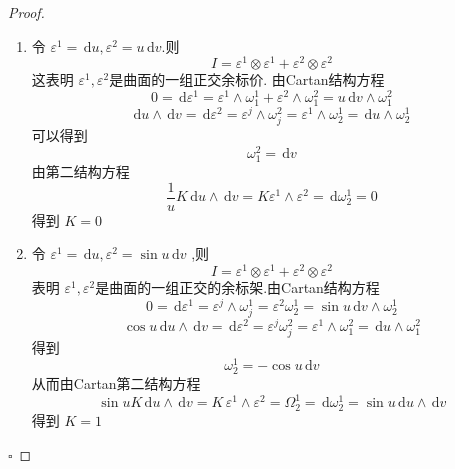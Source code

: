 \documentclass[../../main.tex]{subfiles}
\begin{document}
\begin{proof}
    \begin{enumerate}
        \item 令 \(   \varepsilon ^{1}= \,\mathrm{d} u,  \varepsilon ^{2}=  u\,\mathrm{d} v   \).则 \[
        I=   \varepsilon ^{1}\otimes  \varepsilon ^{1}+  \varepsilon ^{2}\otimes  \varepsilon ^{2}
        \] 这表明 \(   \varepsilon ^{1}, \varepsilon ^{2}  \)是曲面的一组正交余标价.  由Cartan结构方程 \[
        0= \,\mathrm{d}  \varepsilon ^{1}=\varepsilon ^{1}  \wedge \omega _{1}^{1} + \varepsilon ^{2} \wedge  \omega _{1}^{2} = u\,\mathrm{d} v\wedge \omega _{1}^{2}
        \]\[
       \mathrm{d} u\wedge \,\mathrm{d} v= \,\mathrm{d}  \varepsilon ^{2}=   \varepsilon ^{j}\wedge\omega _{j}^{2}  =\varepsilon ^{1}  \wedge \omega _{2}^{1} =\,\mathrm{d} u\wedge   \omega _{2}^{1}
        \]可以得到 \[
         \omega _{1}^{2}= \,\mathrm{d} v
        \]由第二结构方程 \[
       \frac{1 }{u }K\,\mathrm{d} u\wedge \,\mathrm{d} v=   K \varepsilon ^{1}\wedge  \varepsilon ^{2}= \,\mathrm{d}  \omega _{2}^{1}=0
        \]得到 \(  K=0   \)
        \item 令 \(   \varepsilon ^{1}= \,\mathrm{d} u, \varepsilon ^{2}= \sin u\,\mathrm{d} v  \)  ,则 \[
        I=   \varepsilon ^{1}\otimes  \varepsilon ^{1}+  \varepsilon ^{2}\otimes  \varepsilon ^{2}
        \]表明 \(   \varepsilon ^{1}, \varepsilon ^{2}  \)是曲面的一组正交的余标架.由Cartan结构方程 \[
       0= \,\mathrm{d}  \varepsilon ^{1}=  \varepsilon ^{j}\wedge  \omega _{j}^{1}=  \varepsilon ^{2} \omega _{2}^{1}= \sin u \,\mathrm{d} v \wedge  \omega _{2}^{1}
        \] \[
        \cos u\,\mathrm{d} u\wedge \,\mathrm{d} v= \,\mathrm{d}  \varepsilon ^{2}=   \varepsilon ^{j} \omega _{j}^{2}=  \varepsilon ^{1}\wedge  \omega _{1}^{2}= \,\mathrm{d} u\wedge  \omega _{1}^{2}
        \]得到 \[
         \omega _{2}^{1}=- \cos u\,\mathrm{d} v
        \]从而由Cartan第二结构方程 \[
    \sin u K\,\mathrm{d} u\wedge \,\mathrm{d} v=     K \,  \varepsilon ^{1}\wedge  \varepsilon ^{2}=  \Omega _{2}^{1}= \,\mathrm{d}  \omega _{2}^{1}= \sin u\,\mathrm{d} u\wedge \,\mathrm{d} v
        \]得到 \(  K= 1  \) 
    \end{enumerate}
    

    \hfill $\square$
\end{proof}
\end{document}
